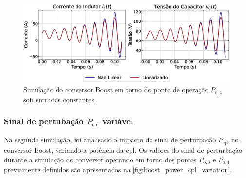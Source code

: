 \begin{figure}[H]
  \centering
  \captionsetup{justification=centering}
  \includegraphics[width=1.\textwidth]{figuras/boost/sim1/op2/result.eps}
  \caption{Simulação do conversor Boost em torno do ponto de operação $P_{\mathrm{o}, 4}$ sob entradas constantes.}
  \label{fig:simulation_1_boost_2}
\end{figure}

\subsubsection{Sinal de pertubação $P_{\textrm{cpl}}$ variável}

Na segunda simulação, foi analisado o impacto do sinal de perturbação $P_{\mathrm{cpl}}$ no conversor Boost, variando a potência da \acrshort{cpl}. Os valores do sinal de perturbação durante a simulação do conversor operando em torno dos pontos $P_{\mathrm{o}, 3}$ e $P_{\mathrm{o}, 4}$ previamente definidos são apresentados na \autoref{fig:boost_power_cpl_variation}.

